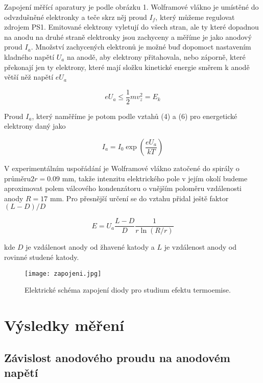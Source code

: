 \documentclass[a4paper,11pt]{article}
\begin{document}
Zapojení měřící aparatury je podle obrázku 1. Wolframové vlákno je umístěné do odvzdušněné elektronky a teče skrz něj proud $ I_f $, který můžeme regulovat zdrojem PS1. Emitované elektrony vyletují do všech stran, ale ty které dopadnou na anodu na druhé straně elektronky jsou zachyceny a měříme je jako anodový proud $ I_a $. Množství zachycených elektronů je možné buď dopomoct nastavením kladného napětí $ U_a $  na anodě, aby elektrony přitahovala, nebo záporně, které překonají jen ty elektrony, které mají složku kinetické energie směrem k anodě větší něž napětí $ e U_a $ 

\begin{equation}
e U_a \le  \frac{1}{2}m v_z^2  = E_k
\end{equation}

\noindent
Proud $ I_a $, který naměříme je potom podle vztahů (4) a (6) pro energetické elektrony daný jako

\begin{equation}
I_a = I_0 \exp \left( {\frac{e U_a}{kT}} \right)
\end{equation}

V experimentálním uspořádání je Wolframové vlákno zatočené do spirály o průměru$  2r = 0.09 $ mm, takže intenzitu elektrického pole v jejím okolí budeme aproximovat polem válcového kondenzátoru o vnějším poloměru vzdálenosti anody $ R = 17 $ mm. Pro přesnější určení se do vztahu přidal ještě faktor $ (L - D) / D $

\begin{equation}
E = U_a \frac{L - D}{D} \frac{1}{r \ln (R / r )}
\end{equation}

\noindent
kde $ D $  je vzdálenost anody od žhavené katody a $ L $  je vzdálenost anody od rovinné studené katody. 



\begin{figure}[htpb]
    \centering
    \texttt{[image: zapojeni.jpg]}
    \caption{Elektrické schéma zapojení diody pro studium efektu termoemise.}
\end{figure}

\newpage

\section{Výsledky měření}

\subsection{Závislost anodového proudu na anodovém napětí}
\end{document}
